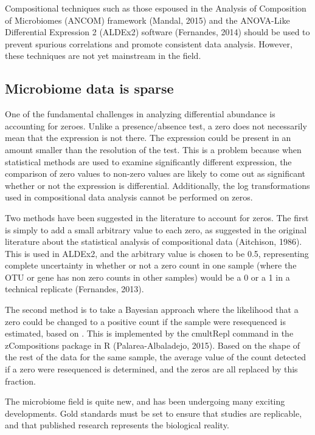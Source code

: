 Compositional techniques such as those espoused in the Analysis of Composition of Microbiomes (ANCOM) framework (Mandal, 2015) and the ANOVA-Like Differential Expression 2 (ALDEx2) software (Fernandes, 2014) should be used to prevent spurious correlations and promote consistent data analysis. However, these techniques are not yet mainstream in the field.

\subsection{Microbiome data is sparse}
One of the fundamental challenges in analyzing differential abundance is accounting for zeroes. Unlike a presence/absence test, a zero does not necessarily mean that the expression is not there. The expression could be present in an amount smaller than the resolution of the test. This is a problem because when statistical methods are used to examine significantly different expression, the comparison of zero values to non-zero values are likely to come out as significant whether or not the expression is differential. Additionally, the log transformations used in compositional data analysis cannot be performed on zeros.

Two methods have been suggested in the literature to account for zeros. The first is simply to add a small arbitrary value to each zero, as suggested in the original literature about the statistical analysis of compositional data (Aitchison, 1986). This is used in ALDEx2, and the arbitrary value is chosen to be 0.5, representing complete uncertainty in whether or not a zero count in one sample (where the OTU or gene has non zero counts in other samples) would be a 0 or a 1 in a technical replicate (Fernandes, 2013).

The second method is to take a Bayesian approach where the likelihood that a zero could be changed to a positive count if the sample were resequenced is estimated, based on . This is implemented by the cmultRepl command in the zCompositions package in R (Palarea-Albaladejo, 2015). Based on the shape of the rest of the data for the same sample, the average value of the count detected if a zero were resequenced is determined, and the zeros are all replaced by this fraction.

The microbiome field is quite new, and has been undergoing many exciting developments. Gold standards must be set to ensure that studies are replicable, and that published research represents the biological reality.

